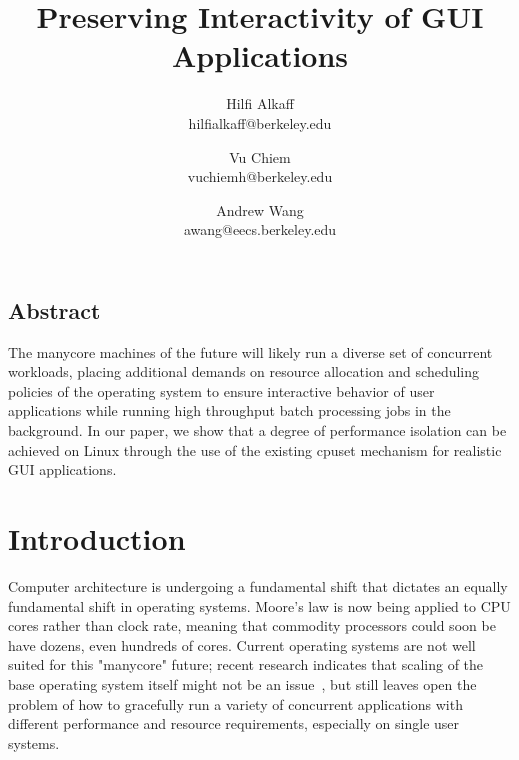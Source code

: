 \documentclass[letterpaper,twocolumn,11pt]{article}
\begin{document}
\date{}

\title{\Large \bf Preserving Interactivity of GUI Applications}

\author{
{\rm Hilfi Alkaff}\\
hilfialkaff@berkeley.edu
\and
{\rm Vu Chiem}\\
vuchiemh@berkeley.edu
\and
{\rm Andrew Wang}\\
awang@eecs.berkeley.edu
} %

\maketitle

\thispagestyle{empty}


\subsection*{Abstract}
The manycore machines of the future will likely run a diverse set of concurrent workloads, placing additional demands on resource allocation and scheduling policies of the operating system to ensure interactive behavior of user applications while running high throughput batch processing jobs in the background. In our paper, we show that a degree of performance isolation can be achieved on Linux through the use of the existing cpuset mechanism for realistic GUI applications.

\section{Introduction}

Computer architecture is undergoing a fundamental shift that dictates an equally fundamental shift in operating systems. Moore's law is now being applied to CPU cores rather than clock rate, meaning that commodity processors could soon be have dozens, even hundreds of cores. Current operating systems are not well suited for this "manycore" future; recent research indicates that scaling of the base operating system itself might not be an issue~\cite{linux:osdi10}, but still leaves open the problem of how to gracefully run a variety of concurrent applications with different performance and resource requirements, especially on single user systems.
\end{document}
